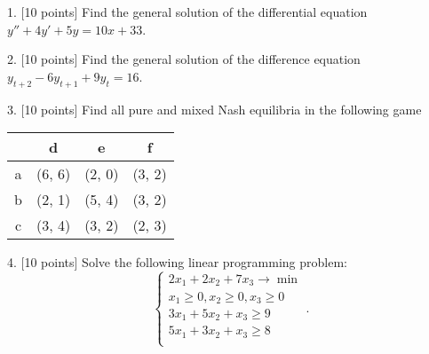 \documentclass[12pt,a4paper]{article}
\begin{document}
\newpage
{}



 1.  {[10 points]} Find the general solution of the differential equation $y'' + 4y' + 5y = 10x+33$.

 
 \newpage
{}

  2.  {[10 points]}  Find the general solution of the difference equation $y_{t+2} - 6y_{t+1} + 9y_t = 16$.

\newpage
{}

  3. {[10 points]} Find all pure and mixed Nash equilibria in the following game

\begin{center}
\begin{tabular}{@{}cccc@{}}
\toprule
  & d & e & f \\ \midrule
a & (6, 6) & (2, 0)  & (3, 2)   \\
b & (2, 1) & (5, 4) & (3, 2)   \\
c & (3, 4) & (3, 2) & (2, 3)   \\ \bottomrule
\end{tabular}
\end{center}

\newpage
{}

4. {[10 points]} Solve the following linear programming problem:
\[
\begin{cases}
2x_1 + 2x_2 + 7x_3 \to \min \\
x_1 \geq 0, x_2 \geq 0, x_3 \geq 0 \\
3x_1 + 5x_2 + x_3 \geq 9 \\
5x_1 + 3x_2 + x_3 \geq 8 \\
\end{cases}.
\]
\end{document}
